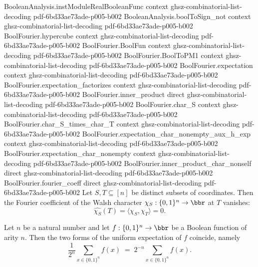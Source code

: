 \begin{lemma}
  {BooleanAnalysis.instModuleRealBooleanFunc}
  {context}
  {ghsz-combinatorial-list-decoding}
  {pdf-6bd33ae73ade-p005-b002}
\proofstep
  {BooleanAnalysis.boolToSign_not}
  {context}
  {ghsz-combinatorial-list-decoding}
  {pdf-6bd33ae73ade-p005-b002}
\proofstep
  {BoolFourier.hypercube}
  {context}
  {ghsz-combinatorial-list-decoding}
  {pdf-6bd33ae73ade-p005-b002}
\proofstep
  {BoolFourier.BoolFun}
  {context}
  {ghsz-combinatorial-list-decoding}
  {pdf-6bd33ae73ade-p005-b002}
\proofstep
  {BoolFourier.BoolToPM1}
  {context}
  {ghsz-combinatorial-list-decoding}
  {pdf-6bd33ae73ade-p005-b002}
\proofstep
  {BoolFourier.expectation}
  {context}
  {ghsz-combinatorial-list-decoding}
  {pdf-6bd33ae73ade-p005-b002}
\proofstep
  {BoolFourier.expectation_factorizes}
  {context}
  {ghsz-combinatorial-list-decoding}
  {pdf-6bd33ae73ade-p005-b002}
\proofstep
  {BoolFourier.inner_product}
  {direct}
  {ghsz-combinatorial-list-decoding}
  {pdf-6bd33ae73ade-p005-b002}
\proofstep
  {BoolFourier.char_S}
  {context}
  {ghsz-combinatorial-list-decoding}
  {pdf-6bd33ae73ade-p005-b002}
\proofstep
  {BoolFourier.char_S_times_char_T}
  {context}
  {ghsz-combinatorial-list-decoding}
  {pdf-6bd33ae73ade-p005-b002}
\proofstep
  {BoolFourier.expectation_char_nonempty_aux_h_exp}
  {context}
  {ghsz-combinatorial-list-decoding}
  {pdf-6bd33ae73ade-p005-b002}
\proofstep
  {BoolFourier.expectation_char_nonempty}
  {context}
  {ghsz-combinatorial-list-decoding}
  {pdf-6bd33ae73ade-p005-b002}
\proofstep
  {BoolFourier.inner_product_char_nonself}
  {direct}
  {ghsz-combinatorial-list-decoding}
  {pdf-6bd33ae73ade-p005-b002}
\proofstep
  {BoolFourier.fourier_coeff}
  {direct}
  {ghsz-combinatorial-list-decoding}
  {pdf-6bd33ae73ade-p005-b002}
Let $S, T \subseteq [n]$ be distinct subsets of coordinates. Then the Fourier
coefficient of the Walsh character $\chi_S : \{0,1\}^n \to \bbr$ at $T$ vanishes:
\[
  \widehat{\chi_S}(T) = \langle \chi_S, \chi_T \rangle = 0.
\]
\end{lemma}

\begin{lemma}
\label{BoolFourier.expectation_eq_expect}
\leanok
{}
Let $n$ be a natural number and let $f : \{0,1\}^n \to \bbr$ be a Boolean function of
arity $n$. Then the two forms of the uniform expectation of $f$ coincide, namely
\[
  \frac{1}{2^n} \sum_{x \in \{0,1\}^n} f(x) \;=\; 2^{-n} \sum_{x \in \{0,1\}^n} f(x).
\]
\end{lemma}

